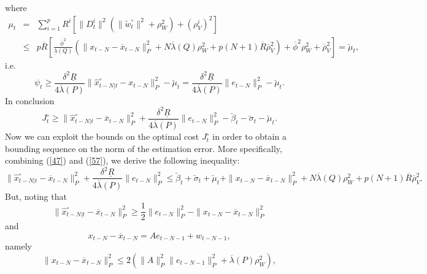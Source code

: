 \documentclass[11pt,journal,onecolumn]{IEEEtran}
\begin{document}
where
\begin{eqnarray*}
\mu_{t}&=&\sum_{i=1}^{p}R^{i}\left[\|D_{t}^{i}\|^{2}\left(\|\tilde{w}_{t}^{\circ}\|^{2}+\rho_{W}^{2}\right)+(\rho_{V}^{i})^{2}\right]\nonumber \\
&\leq&p\overline{R}\left[\frac{\overline{\phi}^{2}}{\underline{\lambda}(Q)}\left(\|x_{t-N}-\overline{x}_{t-N}\|^{2}_{P}+N\overline{\lambda}
(Q)\rho_{W}^{2}+p(N+1)\overline{R}\overline{\rho}_{V}^{2}\right)
+\overline{\phi}^{2}\rho_{W}^{2}+\overline{\rho}_{V}^{2}\right]=\breve{\mu}_{t},
\end{eqnarray*}
i.e.
\begin{equation*}
\psi_{t}\geq\frac{\delta^{2}\underline{R}}{4\overline{\lambda}(P)}\|\hat{x}_{t-N|t}^{\circ}-x_{t-N}\|^{2}_{P}-\breve{\mu}_{t}=
\frac{\delta^{2}\underline{R}}{4\overline{\lambda}(P)}\|e_{t-N}\|_{P}^{2}-\breve{\mu}_{t}.
\end{equation*}
In conclusion
\begin{equation}\label{57}
J_{t}^{\circ}\geq\|\hat{x}_{t-N|t}^{\circ}-\overline{x}_{t-N}\|^{2}_{P}+\frac{\delta^{2}\underline{R}}{4\overline{\lambda}(P)}\|e_{t-N}\|_{P}^{2}
-\breve{\beta}_{t}-\breve{\sigma}_{t}-\breve{\mu}_{t}.
\end{equation}
Now we can exploit the bounds on the optimal cost $J_{t}^{\circ}$ in order to obtain a bounding sequence on the norm of the estimation error. More specifically, combining (\ref{47}) and (\ref{57}), we derive the following inequality:
\begin{equation}\label{58}
\|\hat{x}_{t-N|t}^{\circ}-\overline{x}_{t-N}\|^{2}_{P}+\frac{\delta^{2}\underline{R}}{4\overline{\lambda}(P)}\|e_{t-N}\|_{P}^{2}
\leq\breve{\beta}_{t}+\breve{\sigma}_{t}+\breve{\mu}_{t}+\|x_{t-N}-\overline{x}_{t-N}\|^{2}_{P}+N\overline{\lambda}
(Q)\rho_{W}^{2}+p(N+1)\overline{R}\overline{\rho}_{V}^{2}.
\end{equation}
But, noting that
\begin{equation*}
\|\hat{x}_{t-N|t}^{\circ}-\overline{x}_{t-N}\|^{2}_{P}\geq\frac{1}{2}\|e_{t-N}\|_{P}^{2}-\|x_{t-N}-\overline{x}_{t-N}\|^{2}_{P}
\end{equation*}
and
\begin{equation*}
x_{t-N}-\overline{x}_{t-N} =Ae_{t-N-1}+w_{t-N-1},
\end{equation*}
namely
\begin{equation*}
\|x_{t-N}-\overline{x}_{t-N}\|^{2}_{P}\leq 2\left(\|A\|^{2}_{P}\|e_{t-N-1}\|^{2}_{P}+\overline{\lambda}(P)\rho_{W}^{2}\right),
\end{equation*}
\end{document}
